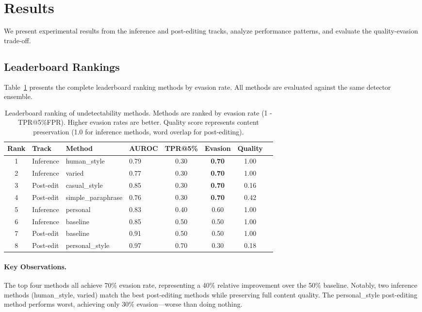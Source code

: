 \section{Results}
\label{sec:results}

We present experimental results from the inference and post-editing tracks, analyze performance patterns, and evaluate the quality-evasion trade-off.

\subsection{Leaderboard Rankings}

Table~\ref{tab:leaderboard} presents the complete leaderboard ranking methods by evasion rate. All methods are evaluated against the same detector ensemble.

\begin{table}[t]
\centering
\caption{Leaderboard ranking of undetectability methods. Methods are ranked by evasion rate (1 - TPR@5\%FPR). Higher evasion rates are better. Quality score represents content preservation (1.0 for inference methods, word overlap for post-editing).}
\label{tab:leaderboard}
\small
\begin{tabular}{@{}clllcccc@{}}
\toprule
\textbf{Rank} & \textbf{Track} & \textbf{Method} & \textbf{AUROC} & \textbf{TPR@5\%} & \textbf{Evasion} & \textbf{Quality} \\
\midrule
1 & Inference & human\_style & 0.79 & 0.30 & \textbf{0.70} & 1.00 \\
2 & Inference & varied & 0.77 & 0.30 & \textbf{0.70} & 1.00 \\
3 & Post-edit & casual\_style & 0.85 & 0.30 & \textbf{0.70} & 0.16 \\
4 & Post-edit & simple\_paraphrase & 0.76 & 0.30 & \textbf{0.70} & 0.42 \\
5 & Inference & personal & 0.83 & 0.40 & 0.60 & 1.00 \\
6 & Inference & baseline & 0.85 & 0.50 & 0.50 & 1.00 \\
7 & Post-edit & baseline & 0.91 & 0.50 & 0.50 & 1.00 \\
8 & Post-edit & personal\_style & 0.97 & 0.70 & 0.30 & 0.18 \\
\bottomrule
\end{tabular}
\end{table}

\paragraph{Key Observations.} The top four methods all achieve 70\% evasion rate, representing a 40\% relative improvement over the 50\% baseline. Notably, two inference methods (human\_style, varied) match the best post-editing methods while preserving full content quality. The personal\_style post-editing method performs worst, achieving only 30\% evasion---worse than doing nothing.

